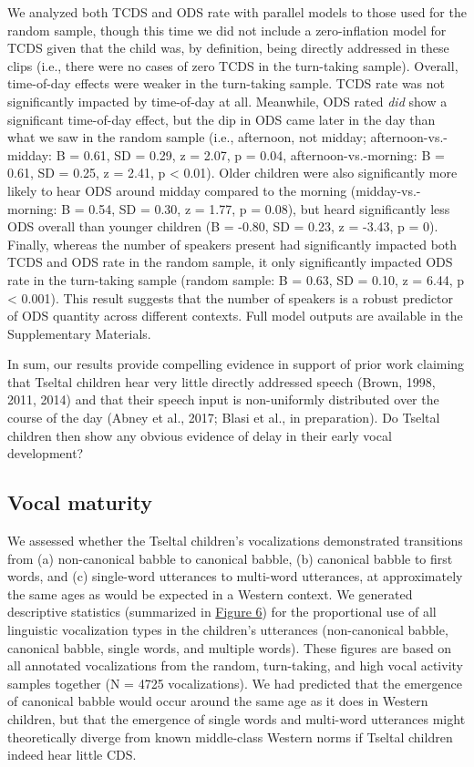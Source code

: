\documentclass[floatsintext,man]{apa6}
\theoremstyle{definition}
\theoremstyle{definition}
\theoremstyle{definition}
\theoremstyle{remark}
\begin{document}
We analyzed both TCDS and ODS rate with parallel models to those used
for the random sample, though this time we did not include a
zero-inflation model for TCDS given that the child was, by definition,
being directly addressed in these clips (i.e., there were no cases of
zero TCDS in the turn-taking sample). Overall, time-of-day effects were
weaker in the turn-taking sample. TCDS rate was not significantly
impacted by time-of-day at all. Meanwhile, ODS rated \emph{did} show a
significant time-of-day effect, but the dip in ODS came later in the day
than what we saw in the random sample (i.e., afternoon, not midday;
afternoon-vs.-midday: B = 0.61, SD = 0.29, z = 2.07, p = 0.04,
afternoon-vs.-morning: B = 0.61, SD = 0.25, z = 2.41, p \textless{}
0.01). Older children were also significantly more likely to hear ODS
around midday compared to the morning (midday-vs.-morning: B = 0.54, SD
= 0.30, z = 1.77, p = 0.08), but heard significantly less ODS overall
than younger children (B = -0.80, SD = 0.23, z = -3.43, p = 0). Finally,
whereas the number of speakers present had significantly impacted both
TCDS and ODS rate in the random sample, it only significantly impacted
ODS rate in the turn-taking sample (random sample: B = 0.63, SD = 0.10,
z = 6.44, p \textless{} 0.001). This result suggests that the number of
speakers is a robust predictor of ODS quantity across different
contexts. Full model outputs are available in the Supplementary
Materials.

In sum, our results provide compelling evidence in support of prior work
claiming that Tseltal children hear very little directly addressed
speech (Brown, 1998, 2011, 2014) and that their speech input is
non-uniformly distributed over the course of the day (Abney et al.,
2017; Blasi et al., in preparation). Do Tseltal children then show any
obvious evidence of delay in their early vocal development?

\subsection{Vocal maturity}\label{vocal-maturity}

We assessed whether the Tseltal children's vocalizations demonstrated
transitions from (a) non-canonical babble to canonical babble, (b)
canonical babble to first words, and (c) single-word utterances to
multi-word utterances, at approximately the same ages as would be
expected in a Western context. We generated descriptive statistics
(summarized in \protect\hyperlink{fig6}{Figure 6}) for the proportional
use of all linguistic vocalization types in the children's utterances
(non-canonical babble, canonical babble, single words, and multiple
words). These figures are based on all annotated vocalizations from the
random, turn-taking, and high vocal activity samples together (N = 4725
vocalizations). We had predicted that the emergence of canonical babble
would occur around the same age as it does in Western children, but that
the emergence of single words and multi-word utterances might
theoretically diverge from known middle-class Western norms if Tseltal
children indeed hear little CDS.
\end{document}
